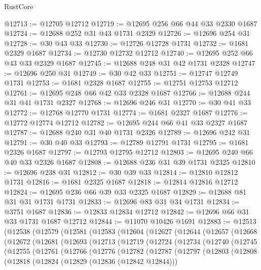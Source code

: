 \begin{lexlean}{RustCore}
\begin{coremodule}
@12713 := @12705 @12712
@12719 := @12695 @256 @66 @44 @33 @2330 @1687
@12724 := @12688 @252 @31 @43 @1731 @2329
@12726 := @12696 @254 @31
@12728 := @30 @43 @33
@12730 := @12726 @12728 @1731
@12732 := @1681 @2329 @1687
@12734 := @12730 @12732 @12712
@12740 := @12695 @252 @66 @43 @33 @2329 @1687
@12745 := @12688 @248 @31 @42 @1731 @2328
@12747 := @12696 @250 @31
@12749 := @30 @42 @33
@12751 := @12747 @12749 @1731
@12753 := @1681 @2328 @1687
@12755 := @12751 @12753 @12712
@12761 := @12695 @248 @66 @42 @33 @2328 @1687
@12766 := @12688 @244 @31 @41 @1731 @2327
@12768 := @12696 @246 @31
@12770 := @30 @41 @33
@12772 := @12768 @12770 @1731
@12774 := @1681 @2327 @1687
@12776 := @12772 @12774 @12712
@12782 := @12695 @244 @66 @41 @33 @2327 @1687
@12787 := @12688 @240 @31 @40 @1731 @2326
@12789 := @12696 @242 @31
@12791 := @30 @40 @33
@12793 := @12789 @12791 @1731
@12795 := @1681 @2326 @1687
@12797 := @12793 @12795 @12712
@12803 := @12695 @240 @66 @40 @33 @2326 @1687
@12808 := @12688 @236 @31 @39 @1731 @2325
@12810 := @12696 @238 @31
@12812 := @30 @39 @33
@12814 := @12810 @12812 @1731
@12816 := @1681 @2325 @1687
@12818 := @12814 @12816 @12712
@12824 := @12695 @236 @66 @39 @33 @2325 @1687
@12829 := @12688 @81 @31 @31 @1731 @1731
@12833 := @12696 @83 @31 @34 @1731
@12834 := @3751 @1687
@12836 := @12833 @12834 @12712
@12842 := @12696 @66 @31 @33 @1731 @1687 @12712
@12844 := @11070 @10426 @1691
@12883 := @12513
    (@12538
      (@12579
        (@12581
          (@12583
            (@12604
              (@12627
                (@12644
                  (@12657
                    (@12668
                      (@12672
                        (@12681
                          (@12693
                            (@12713
                              (@12719
                                (@12724
                                  (@12734
                                    (@12740
                                      (@12745
                                        (@12755
                                          (@12761
                                            (@12766
                                              (@12776
                                                (@12782
                                                  (@12787
                                                    (@12797
                                                      (@12803
                                                        (@12808
                                                          (@12818
                                                            (@12824
                                                              (@12829 (@12836 (@12842 @12844)))

\end{coremodule}
\end{lexlean}
